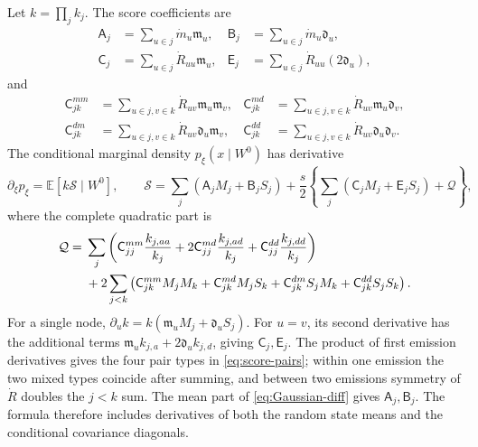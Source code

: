 \documentclass[11pt,a4paper]{amsart}
\theoremstyle{plain}
\theoremstyle{definition}
\theoremstyle{remark}
\newcommand{\EE}{\mathbb{E}}
\begin{document}
Let $k=\prod_j k_j$. The score coefficients are
\begin{equation}\label{eq:score-singletons}
 \begin{aligned}
 \mathsf A_j&=\sum_{u\in j}\dot m_u\mathfrak m_u,&
 \mathsf B_j&=\sum_{u\in j}\dot m_u\mathfrak d_u,\\
 \mathsf C_j&=\sum_{u\in j}\dot R_{uu}\mathfrak m_u,&
 \mathsf E_j&=\sum_{u\in j}\dot R_{uu}(2\mathfrak d_u),
 \end{aligned}
\end{equation}
and
\begin{equation}\label{eq:score-pairs}
 \begin{aligned}
 \mathsf C^{mm}_{jk}&=\sum_{u\in j,v\in k}\dot R_{uv}
                                        \mathfrak m_u\mathfrak m_v,&
 \mathsf C^{md}_{jk}&=\sum_{u\in j,v\in k}\dot R_{uv}
                                        \mathfrak m_u\mathfrak d_v,\\
 \mathsf C^{dm}_{jk}&=\sum_{u\in j,v\in k}\dot R_{uv}
                                        \mathfrak d_u\mathfrak m_v,&
 \mathsf C^{dd}_{jk}&=\sum_{u\in j,v\in k}\dot R_{uv}
                                        \mathfrak d_u\mathfrak d_v.
 \end{aligned}
\end{equation}
The conditional marginal density $p_\xi(x\mid W^0)$ has derivative
\begin{equation}\label{eq:full-score}
 \partial_\xi p_\xi=\EE[k\mathcal S\mid W^0],\qquad
 \mathcal S=\sum_j(\mathsf A_jM_j+\mathsf B_jS_j)
 +\frac{s}{2}\left\{\sum_j(\mathsf C_jM_j+\mathsf E_jS_j)
                                            +\mathcal Q\right\},
\end{equation}
where the complete quadratic part is
\begin{align}\label{eq:Q-score}
 \mathcal Q={}&\sum_j\left(
 \mathsf C^{mm}_{jj}\frac{k_{j,aa}}{k_j}
 +2\mathsf C^{md}_{jj}\frac{k_{j,ad}}{k_j}
 +\mathsf C^{dd}_{jj}\frac{k_{j,dd}}{k_j}\right)\notag\\
 &+2\sum_{j<k}\left(
 \mathsf C^{mm}_{jk}M_jM_k+\mathsf C^{md}_{jk}M_jS_k
 +\mathsf C^{dm}_{jk}S_jM_k+\mathsf C^{dd}_{jk}S_jS_k\right).
\end{align}
For a single node,
$\partial_u k=k(\mathfrak m_u M_j+\mathfrak d_u S_j)$.
For $u=v$, its second derivative has the additional terms
$\mathfrak m_u k_{j,a}+2\mathfrak d_u k_{j,d}$, giving
$\mathsf C_j,\mathsf E_j$. The product of first emission derivatives gives
the four pair types in \eqref{eq:score-pairs}; within one emission the two
mixed types coincide after summing, and between two emissions symmetry of
$\dot R$ doubles the $j<k$ sum. The mean part of
\eqref{eq:Gaussian-diff} gives $\mathsf A_j,\mathsf B_j$.
The formula therefore includes derivatives of both the random state means
and the conditional covariance diagonals.
\end{document}
